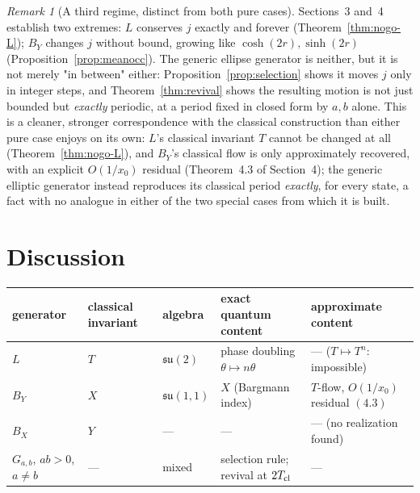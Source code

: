 \documentclass[11pt]{amsart}
\theoremstyle{remark}
\newtheorem*{remark}{Remark}
\begin{document}
\begin{remark}[A third regime, distinct from both pure cases]
Sections~3 and~4 establish two extremes: $L$ conserves $j$ exactly and forever (Theorem~\ref{thm:nogo-L}); $B_Y$ changes $j$ without bound, growing like $\cosh(2r),\sinh(2r)$ (Proposition~\ref{prop:meanocc}). The generic ellipse generator is neither, but it is not merely "in between" either: Proposition~\ref{prop:selection} shows it moves $j$ only in integer steps, and Theorem~\ref{thm:revival} shows the resulting motion is not just bounded but \emph{exactly} periodic, at a period fixed in closed form by $a,b$ alone. This is a cleaner, stronger correspondence with the classical construction than either pure case enjoys on its own: $L$'s classical invariant $T$ cannot be changed at all (Theorem~\ref{thm:nogo-L}), and $B_Y$'s classical flow is only approximately recovered, with an explicit $O(1/x_0)$ residual (Theorem~4.3 of Section~4); the generic elliptic generator instead reproduces its classical period \emph{exactly}, for every state, a fact with no analogue in either of the two special cases from which it is built.
\end{remark}

\section{Discussion}

\begin{center}
\small
\begin{tabular}{lllll}
\hline
generator & classical invariant & algebra & exact quantum content & approximate content \\
\hline
$L$ & $T$ & $\mathfrak{su}(2)$ & phase doubling $\theta\mapsto n\theta$ & --- ($T\mapsto T^n$: impossible) \\
$B_Y$ & $X$ & $\mathfrak{su}(1,1)$ & $X$ (Bargmann index) & $T$-flow, $O(1/x_0)$ residual $(4.3)$ \\
$B_X$ & $Y$ & --- & --- & --- (no realization found) \\
$G_{a,b}$, $ab{>}0$, $a{\ne}b$ & --- & mixed & selection rule; revival at $2T_{\rm cl}$ & --- \\
\hline
\end{tabular}
\end{center}
\end{document}
